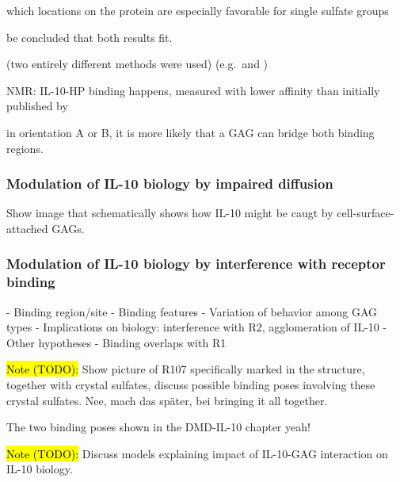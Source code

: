 which locations on the protein are
especially favorable for single sulfate groups



be concluded that both results fit.


 (two entirely different methods were used) (e.g.\ and )



NMR: IL-10-HP binding happens, measured with lower affinity than initially published by


in orientation A or B, it is more likely that a GAG can bridge both binding
regions.


\subsubsection{Modulation of IL-10 biology by impaired diffusion}
Show image that schematically shows how IL-10 might be caugt by cell-surface-attached GAGs.


\subsubsection{Modulation of IL-10 biology by interference with receptor
binding}

    - Binding region/site
    - Binding features
    - Variation of behavior among GAG types
    - Implications on biology: interference with R2, agglomeration of IL-10
    - Other hypotheses
        - Binding overlaps with R1


\hl{Note (TODO):}
Show picture of R107 specifically marked in the structure, together with
crystal sulfates, discuss possible binding poses involving these crystal
sulfates. Nee, mach das später, bei bringing it all together.

The two binding poses shown in the DMD-IL-10 chapter yeah!


\hl{Note (TODO):}
Discuss models explaining impact of IL-10-GAG interaction on IL-10 biology.



